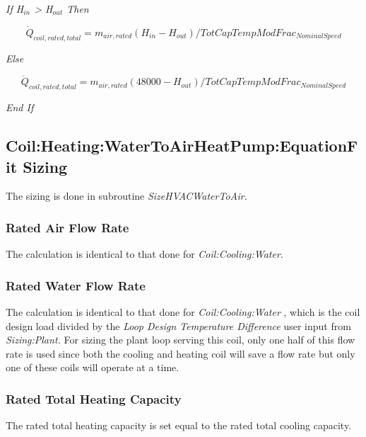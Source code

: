 \emph{If H\(_{in}\) \textgreater{} H\(_{out}\) Then}

\begin{equation}
{\dot Q_{coil,rated,total}} = {m_{air,rated}}({H_{in}} - {H_{out}})/TotCapTempModFra{c_{NominalSpeed}}
\end{equation}

\emph{Else}

\begin{equation}
{\dot Q_{coil,rated,total}} = {m_{air,rated}}(48000 - {H_{out}})/TotCapTempModFra{c_{NominalSpeed}}
\end{equation}

\emph{End If}

\subsection{Coil:Heating:WaterToAirHeatPump:EquationFit Sizing}\label{coilheatingwatertoairheatpumpequationfit-sizing}

The sizing is done in subroutine \emph{SizeHVACWaterToAir.}

\subsubsection{Rated Air Flow Rate}\label{rated-air-flow-rate-2}

The calculation is identical to that done for \emph{Coil:Cooling:Water}.

\subsubsection{Rated Water Flow Rate}\label{rated-water-flow-rate-2}

The calculation is identical to that done for \emph{Coil:Cooling:Water} , which is the coil design load divided by the \emph{Loop Design Temperature Difference} user input from \emph{Sizing:Plant.} For sizing the plant loop serving this coil, only one half of this flow rate is used since both the cooling and heating coil will save a flow rate but only one of these coils will operate at a time.

\subsubsection{Rated Total Heating Capacity}\label{rated-total-heating-capacity}

The rated total heating capacity is set equal to the rated total cooling capacity.

